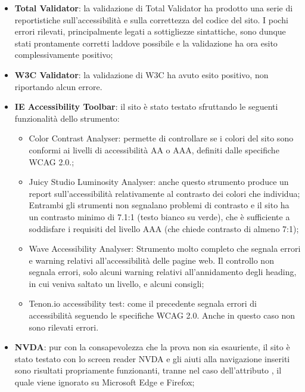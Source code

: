 \documentclass[12pt]{article}
\begin{document}
	\begin{itemize}
		\item \textbf{Total Validator}: la validazione di Total Validator ha prodotto una serie di reportistiche sull'accessibilità e sulla correttezza del codice del sito. I pochi errori rilevati, principalmente legati a sottigliezze sintattiche, sono dunque stati prontamente corretti laddove possibile e la validazione ha ora esito complessivamente positivo;
		
		\item \textbf{W3C Validator}: la validazione di W3C ha avuto esito positivo, non riportando alcun errore.
		
		\item \textbf{IE Accessibility Toolbar}: il sito è stato testato sfruttando le seguenti funzionalità dello strumento:
		\begin{itemize}
			\item Color Contrast Analyser: permette di controllare se i colori del sito sono conformi ai livelli di accessibilità AA o AAA, definiti dalle specifiche WCAG 2.0.; 
			\item Juicy Studio Luminosity Analyser: anche questo strumento produce un report sull'accessibilità relativamente al contrasto dei colori che individua; Entrambi gli strumenti non segnalano problemi di contrasto e il sito ha un contrasto minimo di 7.1:1 (testo bianco su verde), che è sufficiente a soddisfare i requisiti del livello AAA (che chiede contrasto di almeno 7:1);
			\item Wave Accessibility Analyser: Strumento molto completo che segnala errori e warning relativi all'accessibilità delle pagine web. Il controllo non segnala errori, solo alcuni warning relativi all'annidamento degli heading, in cui veniva saltato un livello, e alcuni consigli;
			\item Tenon.io accessibility test: come il precedente segnala errori di accessibilità seguendo le specifiche WCAG 2.0. Anche in questo caso non sono rilevati errori.
		\end{itemize}
		
		\item \textbf{NVDA}: pur con la consapevolezza che la prova non sia esauriente, il sito è stato testato con lo screen reader NVDA e gli aiuti alla navigazione inseriti sono risultati propriamente funzionanti, tranne nel caso dell'attributo , il quale viene ignorato su Microsoft Edge e Firefox;
		

\end{itemize}
\end{document}
